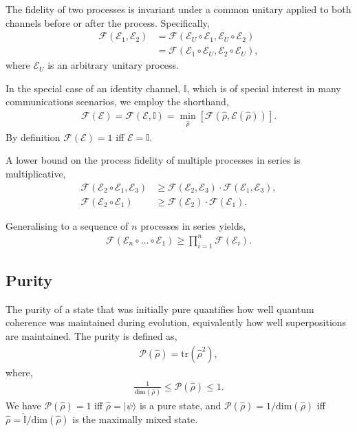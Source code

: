 \documentclass[aps,rmp,twocolumn,amsmath,amssymb,nofootinbib,superscriptaddress,longbibliography,floatfix]{revtex4-1}
\newcommand{\ket}[1]{|#1\rangle}
\begin{document}
The fidelity of two processes is invariant under a common unitary applied to both channels before or after the process. Specifically,
\begin{align}
\mathcal{F}(\mathcal{E}_1,\mathcal{E}_2) &= \mathcal{F}(\mathcal{E}_U\circ\mathcal{E}_1,\mathcal{E}_U\circ\mathcal{E}_2) \nonumber \\
&= \mathcal{F}(\mathcal{E}_1\circ \mathcal{E}_U,\mathcal{E}_2\circ \mathcal{E}_U),
\end{align}
where $\mathcal{E}_U$ is an arbitrary unitary process.

In the special case of an identity channel, $\mathbb{I}$, which is of special interest in many communications scenarios, we employ the shorthand,
\begin{align}
\mathcal{F}(\mathcal{E}) = \mathcal{F}(\mathcal{E},\mathbb{I}) = \min_{\hat\rho} \left[\mathcal{F}(\hat\rho,\mathcal{E}(\hat\rho))\right].
\end{align}
By definition \mbox{$\mathcal{F}(\mathcal{E})=1$} iff \mbox{$\mathcal{E}=\mathbb{I}$}.

A lower bound on the process fidelity of multiple processes in series is multiplicative,
\begin{align}
\mathcal{F}(\mathcal{E}_2\circ\mathcal{E}_1,\mathcal{E}_3) &\geq \mathcal{F}(\mathcal{E}_2,\mathcal{E}_3)\cdot\mathcal{F}(\mathcal{E}_1,\mathcal{E}_3), \nonumber \\
\mathcal{F}(\mathcal{E}_2\circ\mathcal{E}_1) &\geq \mathcal{F}(\mathcal{E}_2)\cdot\mathcal{F}(\mathcal{E}_1).
\end{align}

Generalising to a sequence of $n$ processes in series yields,
\begin{align}
\mathcal{F}(\mathcal{E}_n\circ\dots\circ\mathcal{E}_1) \geq \prod_{i=1}^n \mathcal{F}(\mathcal{E}_i).
\end{align}

%
%

\subsection{Purity}

The purity of a state that was initially pure quantifies how well quantum coherence was maintained during evolution, equivalently how well superpositions are maintained. The purity is defined as,
\begin{align}
\mathcal{P}(\hat\rho) = \mathrm{tr}(\hat\rho^2),
\end{align}
where,
\begin{align}
\frac{1}{\mathrm{dim}(\hat\rho)} \leq \mathcal{P}(\hat\rho) \leq 1.
\end{align}
We have \mbox{$\mathcal{P}(\hat\rho) = 1$} iff \mbox{$\hat\rho=\ket{\psi}$} is a pure state, and \mbox{$\mathcal{P}(\hat\rho)=1/\mathrm{dim}(\hat\rho)$} iff \mbox{$\hat\rho=\mathbb{\hat{I}}/\mathrm{dim}(\hat\rho)$} is the maximally mixed state.
\end{document}
